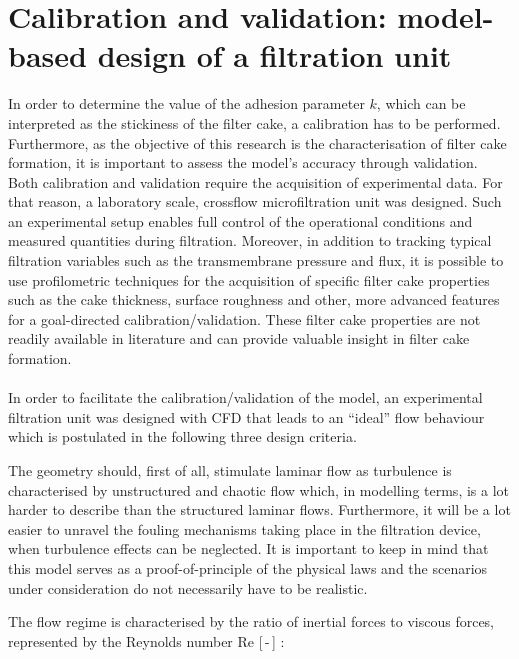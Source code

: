 \section{Calibration and validation: model-based design of a \mbox{filtration} unit \label{sec:calVal}}
In order to determine the value of the adhesion parameter $k$, which can be interpreted %
as the stickiness of the filter cake, a calibration has to be performed. Furthermore, as the objective of this research is the characterisation of filter cake formation, it is important to assess the model's accuracy through validation. Both calibration and validation require the acquisition of experimental data. For that reason, a laboratory scale, crossflow microfiltration unit was designed. Such an experimental setup enables full control of the operational conditions and measured quantities during filtration. Moreover, in addition to tracking typical filtration variables such as the transmembrane pressure and flux, it is possible to use profilometric techniques for the acquisition of specific filter cake properties such as the cake thickness, surface roughness and other, more advanced features for a goal-directed calibration/validation. These filter cake properties are not readily available in literature and can provide valuable insight in filter cake formation. \\ \\
In order to facilitate the calibration/validation of the model, an experimental filtration unit was designed with \gls{CFD} that leads to an ``ideal'' flow behaviour which is postulated in the following three design criteria.\par
The geometry should, first of all, stimulate laminar flow as turbulence is characterised by unstructured and chaotic flow which, in modelling terms, is a lot harder to describe than the structured laminar flows. Furthermore, it will be a lot easier to unravel the fouling mechanisms taking place in the filtration device, when turbulence effects can be neglected. It is important to keep in mind that this model serves as a proof-of-principle of the physical laws and the scenarios under consideration do not necessarily have to be realistic. \par
The flow regime is characterised by the ratio of inertial forces to viscous forces, represented by the Reynolds number Re [\,-\,] \citep{boekMS}:
